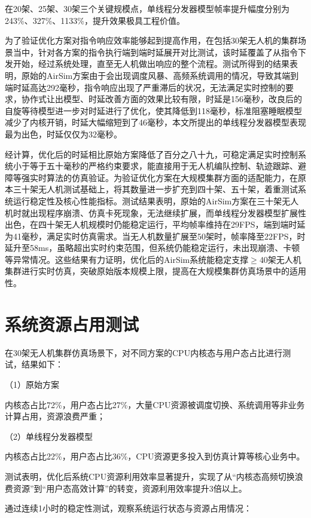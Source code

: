 在20架、25架、30架三个关键规模点，单线程分发器模型帧率提升幅度分别为243\%、327\%、1133\%，提升效果极具工程价值。

为了验证优化方案对指令响应效率能够起到提高作用，在包括30架无人机的集群场景当中，针对各方案的指令执行端到端时延展开对比测试，该时延覆盖了从指令下发开始，经过系统处理，直至无人机做出响应的整个流程。测试所得到的结果表明，原始的AirSim方案由于会出现调度风暴、高频系统调用的情况，导致其端到端时延高达292毫秒，指令响应出现了严重滞后的状况，无法满足实时控制的要求，协作式让出模型、时延改善方面的效果比较有限，时延是156毫秒，改良后的自旋等待模型进一步对时延进行了优化，使其降低到118毫秒，标准阻塞睡眠模型减少了内核开销，时延大幅缩短到了46毫秒，本文所提出的单线程分发器模型表现最为出色，时延仅仅为32毫秒。

经计算，优化后的时延相比原始方案降低了百分之八十九，可稳定满足实时控制系统小于等于五十毫秒的严格约束要求，能直接用于无人机编队控制、轨迹跟踪、避障等强实时算法的仿真验证。为验证优化方案在大规模集群方面的适配能力，在原本三十架无人机测试基础上，将其数量进一步扩充到四十架、五十架，着重测试系统运行稳定性及核心性能指标。测试结果表明，原始的AirSim方案在三十架无人机时就出现程序崩溃、仿真卡死现象，无法继续扩展，而单线程分发器模型扩展性出色，在四十架无人机规模时仍能稳定运行，平均帧率维持在29FPS，端到端时延为41毫秒，满足实时仿真需求。当无人机数量扩展至50架时，帧率降至22FPS，时延升至58ms，虽略超出实时约束范围，但系统仍能稳定运行，未出现崩溃、卡顿等异常情况。这些结果有力证明，优化后的AirSim系统能稳定支撑$\geq$40架无人机集群进行实时仿真，突破原始版本规模上限，提高在大规模集群仿真场景中的适用性。

\section{系统资源占用测试}

在30架无人机集群仿真场景下，对不同方案的CPU内核态与用户态占比进行测试，结果如下：

（1）原始方案

内核态占比72\%，用户态占比27\%，大量CPU资源被调度切换、系统调用等非业务计算占用，资源浪费严重；

（2）单线程分发器模型

内核态占比22\%，用户态占比36\%，CPU资源更多投入到仿真计算等核心业务中。

测试表明，优化后系统CPU资源利用效率显著提升，实现了从``内核态高频切换浪费资源''到``用户态高效计算''的转变，资源利用效率提升3倍以上。

通过连续1小时的稳定性测试，观察系统运行状态与资源占用情况：

